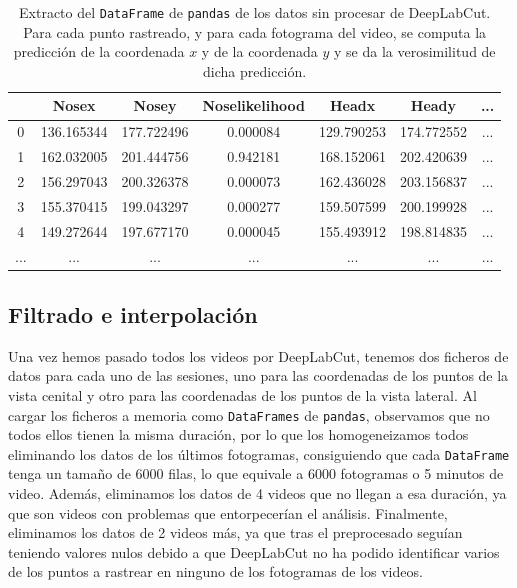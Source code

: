 \begin{table}[h]
  \centering
  \begin{tabular}{|c|c|c|c|c|c|c|}
  \hline
    & Nosex & Nosey & Noselikelihood & Headx & Heady & ... \\
  \hline
  0 & 136.165344 & 177.722496 & 0.000084 & 129.790253 & 174.772552 & ... \\
  1 & 162.032005 & 201.444756 & 0.942181 & 168.152061 & 202.420639 & ... \\
  2 & 156.297043 & 200.326378 & 0.000073 & 162.436028 & 203.156837 & ... \\
  3 & 155.370415 & 199.043297 & 0.000277 & 159.507599 & 200.199928 & ... \\
  4 & 149.272644 & 197.677170 & 0.000045 & 155.493912 & 198.814835 & ... \\
  ... & ... & ... & ... & ... & ... & ... \\
  \hline
  \end{tabular}
  \caption[Datos de DeepLabCut]{Extracto del \texttt{DataFrame} de \texttt{pandas} de los datos sin procesar de DeepLabCut. Para cada punto rastreado, y para cada fotograma del video, se computa la predicción de la coordenada $x$ y de la coordenada $y$ y se da la verosimilitud de dicha predicción.}
  \label{tab:df-example}
\end{table}

\subsection{Filtrado e interpolación}
Una vez hemos pasado todos los videos por DeepLabCut, tenemos dos ficheros de datos para cada uno de las sesiones, uno para las coordenadas de los puntos de la vista cenital y otro para las coordenadas de los puntos de la vista lateral. Al cargar los ficheros a memoria como \texttt{DataFrames} de \texttt{pandas}, observamos que no todos ellos tienen la misma duración, por lo que los homogeneizamos todos eliminando los datos de los últimos fotogramas, consiguiendo que cada \texttt{DataFrame} tenga un tamaño de 6000 filas, lo que equivale a 6000 fotogramas o 5 minutos de video. Además, eliminamos los datos de 4 videos que no llegan a esa duración, ya que son videos con problemas que entorpecerían el análisis. Finalmente, eliminamos los datos de 2 videos más, ya que tras el preprocesado seguían teniendo valores nulos debido a que DeepLabCut no ha podido identificar varios de los puntos a rastrear en ninguno de los fotogramas de los videos.

